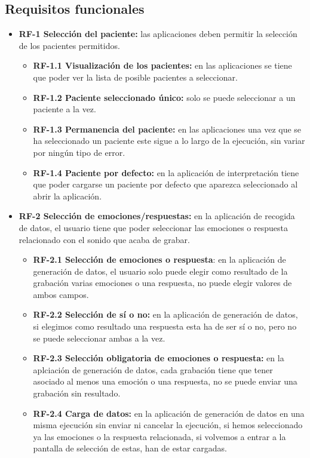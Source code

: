 \subsection{Requisitos funcionales}
\begin{itemize}
	\item \textbf{RF-1 Selección del paciente:} las aplicaciones deben permitir la selección de los pacientes permitidos.
	\begin{itemize}
		\item \textbf{RF-1.1 Visualización de los pacientes:} en las aplicaciones se tiene que poder ver la lista de posible pacientes a seleccionar.
		\item \textbf{RF-1.2 Paciente seleccionado único:} solo se puede seleccionar a un paciente a la vez.
		\item \textbf{RF-1.3 Permanencia del paciente:} en las aplicaciones una vez que se ha seleccionado un paciente este sigue a lo largo de la ejecución, sin variar por ningún tipo de error.
		\item \textbf{RF-1.4 Paciente por defecto:} en la aplicación de interpretación tiene que poder cargarse un paciente por defecto que aparezca seleccionado al abrir la aplicación.
	\end{itemize}
	\item \textbf{RF-2 Selección de emociones/respuestas:} en la aplicación de recogida de datos, el usuario tiene que poder seleccionar las emociones o respuesta relacionado con el sonido que acaba de grabar.
	\begin{itemize}
		\item \textbf{RF-2.1 Selección de emociones o respuesta}: en la aplicación de generación de datos, el usuario solo puede elegir como resultado de la grabación varias emociones o una respuesta, no puede elegir valores de ambos campos.
		\item \textbf{RF-2.2 Selección de sí o no:} en la aplicación de generación de datos, si elegimos como resultado una respuesta esta ha de ser sí o no, pero no se puede seleccionar ambas a la vez.
		\item \textbf{RF-2.3 Selección obligatoria de emociones o respuesta:} en la aplciación de generación de datos, cada grabación tiene que tener asociado al menos una emoción o una respuesta, no se puede enviar una grabación sin resultado.
		\item \textbf{RF-2.4 Carga de datos:} en la aplicación de generación de datos en una misma ejecución sin enviar ni cancelar la ejecución, si hemos seleccionado ya las emociones o la respuesta relacionada, si volvemos a entrar a la pantalla de selección de estas, han de estar cargadas.

\end{itemize}
\end{itemize}
